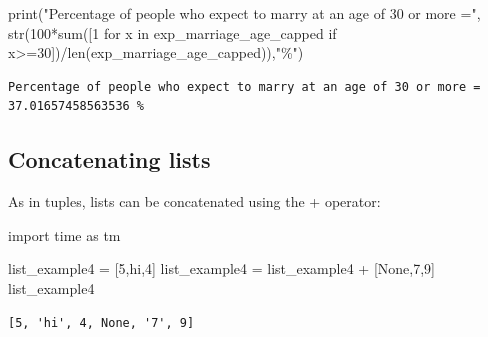 \documentclass[
  letterpaper,
  DIV=11,
  numbers=noendperiod]{scrreprt}
\newenvironment{Shaded}{\begin{snugshade}}{\end{snugshade}}
\newcommand{\BuiltInTok}[1]{\textcolor[rgb]{0.00,0.23,0.31}{#1}}
\newcommand{\ControlFlowTok}[1]{\textcolor[rgb]{0.00,0.23,0.31}{#1}}
\newcommand{\DecValTok}[1]{\textcolor[rgb]{0.68,0.00,0.00}{#1}}
\newcommand{\ImportTok}[1]{\textcolor[rgb]{0.00,0.46,0.62}{#1}}
\newcommand{\KeywordTok}[1]{\textcolor[rgb]{0.00,0.23,0.31}{#1}}
\newcommand{\NormalTok}[1]{\textcolor[rgb]{0.00,0.23,0.31}{#1}}
\newcommand{\OperatorTok}[1]{\textcolor[rgb]{0.37,0.37,0.37}{#1}}
\newcommand{\StringTok}[1]{\textcolor[rgb]{0.13,0.47,0.30}{#1}}
\newcommand{\VariableTok}[1]{\textcolor[rgb]{0.07,0.07,0.07}{#1}}
\begin{document}
\begin{Shaded}
\begin{Highlighting}[]
\BuiltInTok{print}\NormalTok{(}\StringTok{"Percentage of people who expect to marry at an age of 30 or more ="}\NormalTok{, }\BuiltInTok{str}\NormalTok{(}\DecValTok{100}\OperatorTok{*}\BuiltInTok{sum}\NormalTok{([}\DecValTok{1} \ControlFlowTok{for}\NormalTok{ x }\KeywordTok{in}\NormalTok{ exp\_marriage\_age\_capped }\ControlFlowTok{if}\NormalTok{ x}\OperatorTok{\textgreater{}=}\DecValTok{30}\NormalTok{])}\OperatorTok{/}\BuiltInTok{len}\NormalTok{(exp\_marriage\_age\_capped)),}\StringTok{"\%"}\NormalTok{)}
\end{Highlighting}
\end{Shaded}

\begin{verbatim}
Percentage of people who expect to marry at an age of 30 or more = 37.01657458563536 %
\end{verbatim}

\hypertarget{concatenating-lists}{%
\subsection{Concatenating lists}\label{concatenating-lists}}

As in tuples, lists can be concatenated using the + operator:

\begin{Shaded}
\begin{Highlighting}[]
\ImportTok{import}\NormalTok{ time }\ImportTok{as}\NormalTok{ tm}
\end{Highlighting}
\end{Shaded}

\begin{Shaded}
\begin{Highlighting}[]
\NormalTok{list\_example4 }\OperatorTok{=}\NormalTok{ [}\DecValTok{5}\NormalTok{,}\StringTok{\textquotesingle{}hi\textquotesingle{}}\NormalTok{,}\DecValTok{4}\NormalTok{] }
\NormalTok{list\_example4 }\OperatorTok{=}\NormalTok{ list\_example4 }\OperatorTok{+}\NormalTok{ [}\VariableTok{None}\NormalTok{,}\StringTok{\textquotesingle{}7\textquotesingle{}}\NormalTok{,}\DecValTok{9}\NormalTok{]}
\NormalTok{list\_example4}
\end{Highlighting}
\end{Shaded}

\begin{verbatim}
[5, 'hi', 4, None, '7', 9]
\end{verbatim}
\end{document}
